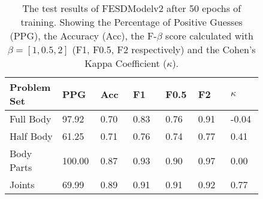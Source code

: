     \begin{table}[!htbp]
        \centering
        \caption[Test Results of FESDModelv2]{The test results of FESDModelv2 after 50 epochs of training. Showing the Percentage of Positive Guesses (PPG), the Accuracy (Acc), the F-$\beta$ score calculated with $\beta = [1, 0.5, 2]$ (F1, F0.5, F2 respectively) and the Cohen's Kappa Coefficient ($\kappa$).}
        \label{tab:res_v2}
        \begin{tabular}{p{0.12\linewidth}p{0.12\linewidth}p{0.12\linewidth}p{0.12\linewidth}p{0.12\linewidth}p{0.12\linewidth}p{0.12\linewidth}}
\hline
Problem Set &    PPG &  Acc &   F1 &  F0.5 &   F2 &  $\kappa$ \\
\hline
Full Body  &  97.92 & 0.70 & 0.83 &  0.76 & 0.91 &     -0.04 \\
Half Body  &  61.25 & 0.71 & 0.76 &  0.74 & 0.77 &      0.41 \\
Body Parts & 100.00 & 0.87 & 0.93 &  0.90 & 0.97 &      0.00 \\
Joints     &  69.99 & 0.89 & 0.91 &  0.91 & 0.92 &      0.77 \\
\hline
\end{tabular}

    \end{table}
  